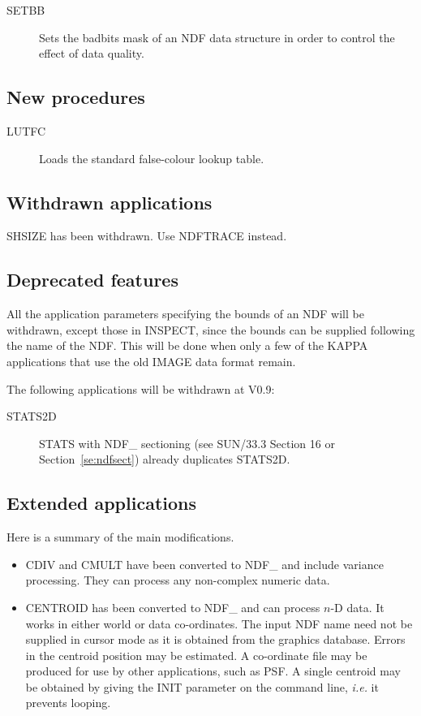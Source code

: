 {\begin{description}
  \item [SETBB]  Sets the badbits mask of an NDF data structure in order to
    control the effect of data quality.
\end{description}

\subsection{New procedures}
\begin{description}
  \item [LUTFC]  Loads the standard false-colour lookup table.
\end{description}

\subsection{Withdrawn applications}
  SHSIZE has been withdrawn.  Use NDFTRACE instead.

\subsection{Deprecated features}
  All the application parameters specifying the bounds of an NDF will
  be withdrawn, except those in INSPECT, since the bounds can be
  supplied following the name of the NDF.  This will be done when
  only a few of the {\small KAPPA} applications that use the old IMAGE
  data format remain.

  The following applications will be withdrawn at V0.9:
  \begin{description}
  \item[STATS2D] STATS with NDF\_ sectioning (see SUN/33.3 Section 16
     or Section~\ref{se:ndfsect}) already duplicates STATS2D.
  \end{description}

\subsection{Extended applications}
  
  Here is a summary of the main modifications.
\begin{itemize}
  \item CDIV and CMULT have been converted to NDF\_ and include variance
    processing.  They can process any non-complex numeric data.

  \item CENTROID has been converted to NDF\_ and can process $n$-D data.
    It works in either world or data co-ordinates.  The input NDF
    name need not be supplied in cursor mode as it is obtained from
    the graphics database.  Errors in the centroid position may be
    estimated.  A co-ordinate file may be produced for use by other
    applications, such as PSF.  A single centroid may be obtained
    by giving the INIT parameter on the command line, {\it i.e.} it
    prevents looping.


\end{itemize}}
